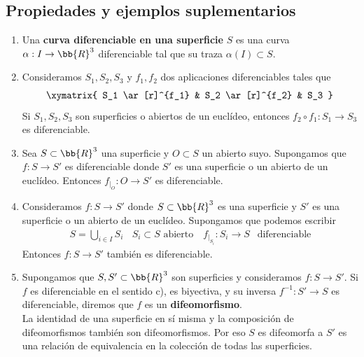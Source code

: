 \subsection{Propiedades y ejemplos suplementarios}
\begin{enumerate}
    \item Una \textbf{curva diferenciable en una superficie} $S$ es una curva $\alpha:I\to \bb{R}^3$ diferenciable tal que su traza $\alpha(I)\subset S$. 
    
    \item Consideramos $S_1, S_2, S_3$  y $f_1, f_2$ dos aplicaciones diferenciables tales que 
    \begin{gather*}
        \xymatrix{
            S_1 \ar[r]^{f_1} & S_2 \ar[r]^{f_2} & S_3
        }
    \end{gather*}
    Si $S_1, S_2, S_3$ son superficies o abiertos de un euclídeo, entonces $f_2\circ f_1: S_1 \to S_3$ es diferenciable.

    \item Sea $S\subset \bb{R}^3$ una superficie y $O\subset S$ un abierto suyo. Supongamos que $f:S\to S'$ es diferenciable donde $S'$ es una superficie o un abierto de un euclídeo. Entonces $f_{|_O}:O\to S'$ es diferenciable.
    
    \item Consideramos $f:S\to S'$ donde $S\subset \bb{R}^3$ es una superficie y $S'$ es una superficie o un abierto de un euclídeo. Supongamos que podemos escribir
    \begin{gather*}
        S=\bigcup\limits_{i\in I} S_i\ \ \ \ S_i\subset S \text{ abierto }\ \ \ f_{|_{S_i}}:S_i\to S\ \ \text{ diferenciable}
    \end{gather*}
    Entonces $f:S\to S'$ también es diferenciable.

    \item Supongamos que $S,S'\subset \bb{R}^3$ son superficies y consideramos $f:S\to S'$. Si $f$ es diferenciable en el sentido c), es biyectiva, y su inversa $f^{-1}:S'\to S$ es diferenciable, diremos que $f$ es un \textbf{difeomorfismo}. \\
    
    La identidad de una superficie en sí misma y la composición de difeomorfismos también son difeomorfismos. Por eso $S$ es difeomorfa a $S'$ es una relación de equivalencia en la colección de todas las superficies.
\end{enumerate}

